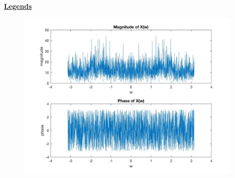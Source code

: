 \documentclass{article}
\begin{document}
\color{red}
\underline{\textbf{Legends}}
\color{black}
\begin{figure}[H]

\includegraphics[scale=.5]{Legends1}
\end{figure}
\end{document}
